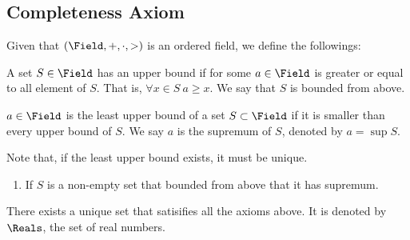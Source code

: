 \subsection{Completeness Axiom}
Given that \((\Field, + ,\cdot , >)\) is an ordered field, we define the followings:
\begin{definition} 
    A set \(S \in \Field\) has an upper bound if for some \(a \in \Field\) is greater or equal to all element of \(S\). That is, \(\forall x \in S\: a \geq x\). We say that \(S\) is bounded from above.
\end{definition}
\begin{definition} 
    \(a \in \Field\) is the least upper bound of a set \(S \subset \Field\) if it is smaller than every upper bound of \(S\). We say \(a\) is the supremum of \(S\), denoted by \(a = \sup{S}\).
\end{definition}
Note that, if the least upper bound exists, it must be unique.
\begin{enumerate}[wide,resume,label={Axiom \arabic*.}]
    \item If \(S\) is a non-empty set that bounded from above that it has supremum.
\end{enumerate}
\begin{theorem}
    There exists a unique set that satisifies all the axioms above. It is denoted by \(\Reals\), the set of real numbers.
\end{theorem}
